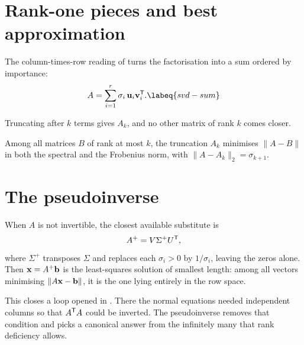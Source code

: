 \section{Rank-one pieces and best approximation}

The column-times-row reading of  turns the factorisation into
a sum ordered by importance:
\begin{equation}
	A=\sum_{i=1}^{r}\sigma_i\,\vect{u}_i\vect{v}_i\tp .
	\labeq{svd-sum}
\end{equation}

Truncating after \(k\) terms gives \(A_k\), and no other matrix of rank \(k\)
comes closer.

\begin{theorem}
Among all matrices \(B\) of rank at most \(k\), the truncation \(A_k\) minimises
\(\lVert A-B\rVert\) in both the spectral and the Frobenius norm, with
\(\lVert A-A_k\rVert_2=\sigma_{k+1}\).
\end{theorem}


\section{The pseudoinverse}

When \(A\) is not invertible, the closest available substitute is
\[
	A^{+}=V\Sigma^{+}U^{\mathsf{T}},
\]
where \(\Sigma^{+}\) transposes \(\Sigma\) and replaces each \(\sigma_i>0\) by
\(1/\sigma_i\), leaving the zeros alone. Then \(\mathbf{x}=A^{+}\mathbf{b}\) is the
least-squares solution of smallest length: among all vectors minimising
\(\lVert A\mathbf{x}-\mathbf{b}\rVert\), it is the one lying entirely in the row
space.

\begin{remark}
This closes a loop opened in . There the normal equations
needed independent columns so that \(A^{\mathsf{T}} A\) could be inverted. The
pseudoinverse removes that condition and picks a canonical answer from the
infinitely many that rank deficiency allows.
\end{remark}
